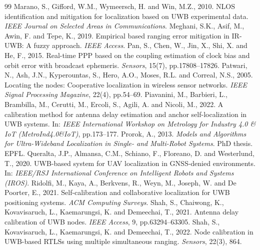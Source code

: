 \documentclass[10pt,a4paper]{article}
\begin{document}
\begin{thebibliography}{99}
 Marano, S., Gifford, W.M., Wymeersch, H. and Win, M.Z., 2010. NLOS identification and mitigation for localization based on UWB experimental data. \emph{IEEE Journal on Selected Areas in Communications}.
 Meghani, S.K., Asif, M., Awin, F. and Tepe, K., 2019. Empirical based ranging error mitigation in IR-UWB: A fuzzy approach. \emph{IEEE Access}.
 Pan, S., Chen, W., Jin, X., Shi, X. and He, F., 2015. Real-time PPP based on the coupling estimation of clock bias and orbit error with broadcast ephemeris. \emph{Sensors}, 15(7), pp.17808--17826.
 Patwari, N., Ash, J.N., Kyperountas, S., Hero, A.O., Moses, R.L. and Correal, N.S., 2005. Locating the nodes: Cooperative localization in wireless sensor networks. \emph{IEEE Signal Processing Magazine}, 22(4), pp.54--69.
 Piavanini, M., Barbieri, L., Brambilla, M., Cerutti, M., Ercoli, S., Agili, A. and Nicoli, M., 2022. A calibration method for antenna delay estimation and anchor self-localization in UWB systems. In: \emph{IEEE International Workshop on Metrology for Industry 4.0 \& IoT (MetroInd4.0\&IoT)}, pp.173--177.
 Prorok, A., 2013. \emph{Models and Algorithms for Ultra-Wideband Localization in Single- and Multi-Robot Systems}. PhD thesis. EPFL.
 Queralta, J.P., Almansa, C.M., Schiano, F., Floreano, D. and Westerlund, T., 2020. UWB-based system for UAV localization in GNSS-denied environments. In: \emph{IEEE/RSJ International Conference on Intelligent Robots and Systems (IROS)}.
 Ridolfi, M., Kaya, A., Berkvens, R., Weyn, M., Joseph, W. and De Poorter, E., 2021. Self-calibration and collaborative localization for UWB positioning systems. \emph{ACM Computing Surveys}.
 Shah, S., Chaiwong, K., Kovavisaruch, L., Kaemarungsi, K. and Demeechai, T., 2021. Antenna delay calibration of UWB nodes. \emph{IEEE Access}, 9, pp.63294--63305.
 Shah, S., Kovavisaruch, L., Kaemarungsi, K. and Demeechai, T., 2022. Node calibration in UWB-based RTLSs using multiple simultaneous ranging. \emph{Sensors}, 22(3), 864.

\end{thebibliography}
\end{document}
